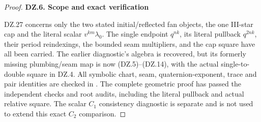 \begin{proof}
\par

\medskip\noindent\textbf{DZ.6. Scope and exact verification}

\par\nobreak

DZ.27 concerns only the two stated initial/reflected fan objects,
the one III-star cap and the literal scalar \(v^{km}\lambda_0\).
The single endpoint \(q^{nk}\), its literal pullback
\(q^{2nk}\), their period reindexings, the bounded seam
multipliers, and the cap square have all been carried.
The earlier diagnostic's algebra is recovered, but its formerly
missing plumbing/seam map is now (DZ.5)--(DZ.14), with the actual
single-to-double square in DZ.4.
All symbolic chart, seam, quaternion-exponent, trace and pair
identities are checked in
.
The complete geometric proof has passed the independent checks and
root audits, including the literal pullback and actual relative square.
The scalar \(C_1\) consistency diagnostic
is separate and is not used to extend this exact \(C_2\) comparison.
\end{proof}
